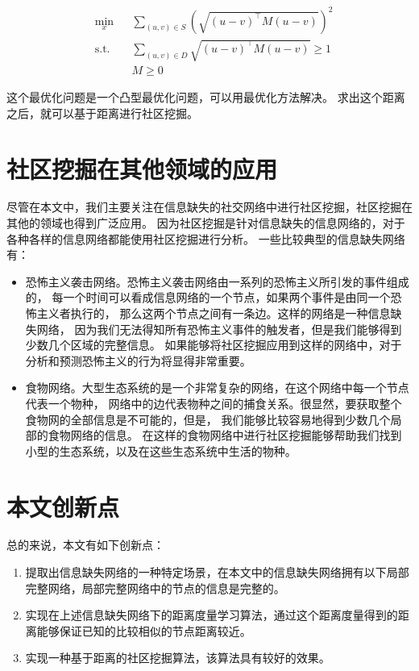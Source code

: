 \begin{equation}
\begin{aligned}
& \underset{x}{\min}
& & \sum_{(u,v) \in S} (\sqrt{(u-v)^\top M (u-v)})^2 \\
& \text{s.t.}
& & \sum_{(u,v) \in D} \sqrt{(u-v)^\top M (u-v)} \geq 1 \\
& & & M \geq 0
\end{aligned}
\end {equation}

这个最优化问题是一个凸型最优化问题，可以用最优化方法解决。
求出这个距离之后，就可以基于距离进行社区挖掘。

\section{社区挖掘在其他领域的应用}

尽管在本文中，我们主要关注在信息缺失的社交网络中进行社区挖掘，社区挖掘在其他的领域也得到广泛应用。
因为社区挖掘是针对信息缺失的信息网络的，对于各种各样的信息网络都能使用社区挖掘进行分析。
一些比较典型的信息缺失网络有：

\begin{itemize}
    \item 恐怖主义袭击网络。恐怖主义袭击网络由一系列的恐怖主义所引发的事件组成的，
    每一个时间可以看成信息网络的一个节点，如果两个事件是由同一个恐怖主义者执行的，
    那么这两个节点之间有一条边。这样的网络是一种信息缺失网络，
    因为我们无法得知所有恐怖主义事件的触发者，但是我们能够得到少数几个区域的完整信息。
    如果能够将社区挖掘应用到这样的网络中，对于分析和预测恐怖主义的行为将显得非常重要。
    \item 食物网络。大型生态系统的是一个非常复杂的网络，在这个网络中每一个节点代表一个物种，
    网络中的边代表物种之间的捕食关系。很显然，要获取整个食物网的全部信息是不可能的，但是，
    我们能够比较容易地得到少数几个局部的食物网络的信息。
    在这样的食物网络中进行社区挖掘能够帮助我们找到小型的生态系统，以及在这些生态系统中生活的物种。
\end{itemize}

\section{本文创新点}

总的来说，本文有如下创新点：

\begin{enumerate}
\item 提取出信息缺失网络的一种特定场景，在本文中的信息缺失网络拥有以下局部完整网络，局部完整网络中的节点的信息是完整的。
\item 实现在上述信息缺失网络下的距离度量学习算法，通过这个距离度量得到的距离能够保证已知的比较相似的节点距离较近。
\item 实现一种基于距离的社区挖掘算法，该算法具有较好的效果。
\end{enumerate}

